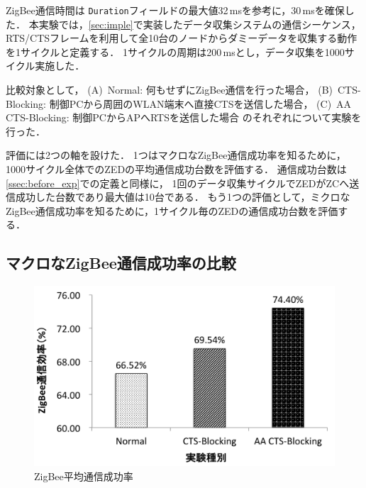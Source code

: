 \documentclass[technicalreport]{ieicej}
\begin{document}
ZigBee通信時間は
\texttt{Duration}フィールドの最大値32\,msを参考に，30\,msを確保した．
本実験では，\ref{sec:imple}で実装したデータ収集システムの通信シーケンス，
RTS/CTSフレームを利用して全10台のノードからダミーデータを収集する動作を1サイクルと定義する．
1サイクルの周期は200\,msとし，データ収集を1000サイクル実施した．%

比較対象として，
(A)~Normal: 何もせずにZigBee通信を行った場合，
(B)~CTS-Blocking: 制御PCから周囲のWLAN端末へ直接CTSを送信した場合，
(C)~AA CTS-Blocking: 制御PCからAPへRTSを送信した場合
のそれぞれについて実験を行った．

評価には2つの軸を設けた．
1つはマクロなZigBee通信成功率を知るために，1000サイクル全体でのZEDの平均通信成功台数を評価する．
通信成功台数は\ref{ssec:before_exp}での定義と同様に，
1回のデータ収集サイクルでZEDがZCへ送信成功した台数であり最大値は10台である．
もう1つの評価として，ミクロなZigBee通信成功率を知るために，1サイクル毎のZEDの通信成功台数を評価する．

\subsection{マクロなZigBee通信成功率の比較}
\label{sec:exp_result_all}

\begin{figure}[bt]
 \centering
 \includegraphics[width=\columnwidth]{figure/eff_all_zigbee.pdf}
 \caption{ZigBee平均通信成功率}
 \label{fig:eff_all_zigbee}
\end{figure}
\end{document}
